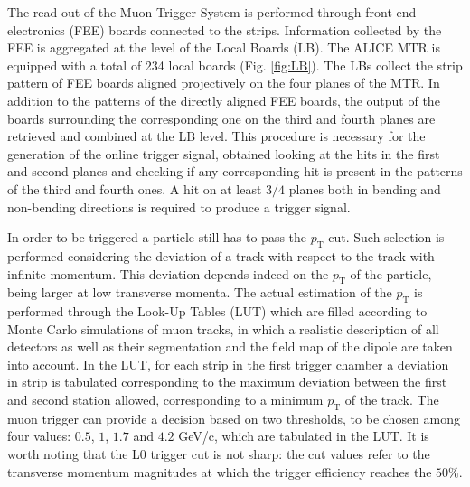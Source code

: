 The read-out of the Muon Trigger System is performed through front-end electronics (FEE) boards connected to the strips.
Information collected by the FEE is aggregated at the level of the Local Boards (LB).
The ALICE MTR is equipped with a total of 234 local boards (Fig. \ref{fig:LB}).
The LBs collect the strip pattern of FEE boards aligned projectively on the four planes of the MTR.
In addition to the patterns of the directly aligned FEE boards, the output of the boards surrounding the corresponding one on the third and fourth planes are retrieved and combined at the LB level.
This procedure is necessary for the generation of the online trigger signal, obtained looking at the hits in the first and second planes and checking if any corresponding hit is present in the patterns of the third and fourth ones.
A hit on at least $3/4$ planes both in bending and non-bending directions is required to produce a trigger signal.

In order to be triggered a particle still has to pass the $p_{\mathrm{T}}$ cut.
Such selection is performed considering the deviation of a track with respect to the track with infinite momentum.
This deviation depends indeed on the $p_{\mathrm{T}}$ of the particle, being larger at low transverse momenta.
The actual estimation of the $p_{\mathrm{T}}$ is performed through the Look-Up Tables (LUT) which are filled according to Monte Carlo simulations of muon tracks, in which a realistic description of all detectors as well as their segmentation and the field map of the dipole are taken into account.
In the LUT, for each strip in the first trigger chamber a deviation in strip is tabulated corresponding to the maximum deviation between the first and second station allowed, corresponding to a minimum $p_{\mathrm{T}}$ of the track.
The muon trigger can provide a decision based on two thresholds, to be chosen among four values: $0.5$, $1$, $1.7$ and $4.2$ GeV/c, which are tabulated in the LUT.
It is worth noting that the L0 trigger cut is not sharp: the cut values refer to the transverse momentum magnitudes at which the trigger efficiency reaches the $50\%$. 
